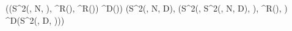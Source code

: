 ((S^{2}(, N\Rightarrow, ), ^{R}(), ^{R}()) \cdot {}^{D}()) \cdot {}(S^{2}(, N\Rightarrow, D\Rightarrow), (S^{2}(, S^{2}(, N\Rightarrow, D\Rightarrow), ), ^{R}(), ) \cdot {}^{D}(S^{2}(, D\Rightarrow, )))
